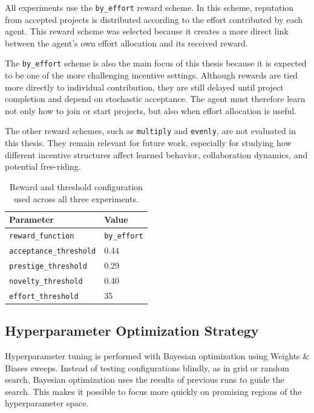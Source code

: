 \documentclass[english,bachelor]{hsluthesis}
\begin{document}
All experiments use the \texttt{by\_effort} reward scheme. In this scheme, reputation from accepted projects is distributed according to the effort contributed by each agent. This reward scheme was selected because it creates a more direct link between the agent's own effort allocation and its received reward.

The \texttt{by\_effort} scheme is also the main focus of this thesis because it is expected to be one of the more challenging incentive settings. Although rewards are tied more directly to individual contribution, they are still delayed until project completion and depend on stochastic acceptance. The agent must therefore learn not only how to join or start projects, but also when effort allocation is useful.

The other reward schemes, such as \texttt{multiply} and \texttt{evenly}, are not evaluated in this thesis. They remain relevant for future work, especially for studying how different incentive structures affect learned behavior, collaboration dynamics, and potential free-riding.

\begin{table}[H]
\centering
\begin{tabular}{l l}
\hline
Parameter & Value \\
\hline
\texttt{reward\_function} & \texttt{by\_effort} \\
\texttt{acceptance\_threshold} & 0.44 \\
\texttt{prestige\_threshold} & 0.29 \\
\texttt{novelty\_threshold} & 0.40 \\
\texttt{effort\_threshold} & 35 \\
\hline
\end{tabular}
\caption{Reward and threshold configuration used across all three experiments.}
\label{tab:reward_configs}
\end{table}

\subsection{Hyperparameter Optimization Strategy}

Hyperparameter tuning is performed with Bayesian optimization using Weights \& Biases sweeps. Instead of testing configurations blindly, as in grid or random search, Bayesian optimization uses the results of previous runs to guide the search. This makes it possible to focus more quickly on promising regions of the hyperparameter space.
\end{document}
